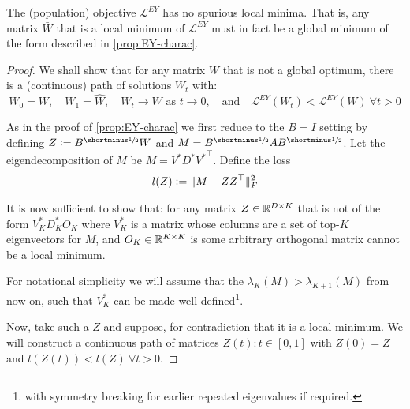 \begin{proposition}
    The (population) objective $\mathcal{L}^{EY}$ has no spurious local minima.
    That is, any matrix $\bar{W}$ that is a local minimum of $\mathcal{L}^{EY}$ must in fact be a global minimum of the form described in \cref{prop:EY-charac}.
\end{proposition}
\begin{proof}
    We shall show that for any matrix $W$ that is not a global optimum, there is a (continuous) path of solutions $W_t$ with:
    \begin{equation*}
        W_0 = W, \quad W_1 = \hat{W}, \quad W_t \to W \text{ as } t \to 0, \quad \text{and} \quad \mathcal{L}^{EY}(W_t) < \mathcal{L}^{EY}(W) \: \forall t > 0
    \end{equation*}

    As in the proof of \cref{prop:EY-charac} we first reduce to the $B=I$ setting by defining $Z \defeq B^{\mhalf} W$ and $M = B^\mhalf A B^\mhalf$.
    Let the eigendecomposition of $M$ be $M = V^* D^* {V^*}^\top$.
    Define the loss
    \begin{align*}
        l(Z) \vcentcolon= \lVert M - Z Z^\top\rVert_F^2
    \end{align*}

    It is now sufficient to show that: for any matrix $Z \in \mathbb{R}^{D \times K}$ that is not of the form $V^*_K D^*_K O_K$ where $V^*_K$ is a matrix whose columns are a set of top-$K$ eigenvectors for $M$, and $O_K \in \mathbb{R}^{K \times K}$ is some arbitrary orthogonal matrix cannot be a local minimum.

    For notational simplicity we will assume that the $\lambda_K(M) > \lambda_{K+1}(M)$ from now on, such that $V_K^*$ can be made well-defined\footnote{with symmetry breaking for earlier repeated eigenvalues if required.}.

    Now, take such a $Z$ and suppose, for contradiction that it is a local minimum.
    We will construct a continuous path of matrices $Z(t): t \in [0,1]$ with $Z(0) = Z$ and $l\left(Z(t)\right) < l(Z) \: \forall t > 0$.




\end{proof}
